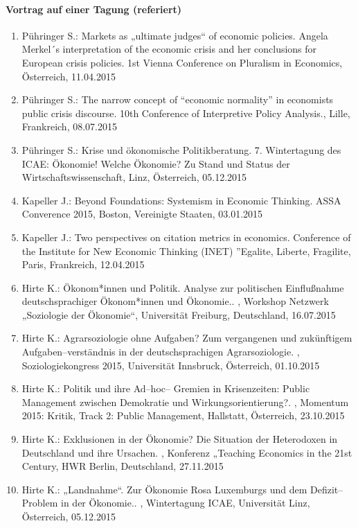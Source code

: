 \paragraph{Vortrag auf einer Tagung (referiert)}
\begin{enumerate}
	\item Pühringer S.: Markets as „ultimate judges“ of economic policies. Angela Merkel´s interpretation of the economic crisis and her conclusions for European crisis policies. 1st Vienna Conference on Pluralism in Economics, Österreich, 11.04.2015
	\item Pühringer S.: The narrow concept of “economic normality” in economists public crisis discourse. 10th Conference of Interpretive Policy Analysis., Lille, Frankreich, 08.07.2015
	\item Pühringer S.: Krise und ökonomische Politikberatung. 7. Wintertagung des ICAE: Ökonomie! Welche Ökonomie? Zu Stand und Status der Wirtschaftswissenschaft, Linz, Österreich, 05.12.2015
	\item Kapeller J.: Beyond Foundations: Systemism in Economic Thinking. ASSA Converence 2015, Boston, Vereinigte Staaten, 03.01.2015
	\item Kapeller J.: Two perspectives on citation metrics in economics. Conference of the Institute for New Economic Thinking (INET) ''Egalite, Liberte, Fragilite, Paris, Frankreich, 12.04.2015
	\item Hirte K.: Ökonom*innen und Politik. Analyse zur politischen Einflußnahme deutschsprachiger Ökonom*innen und Ökonomie.. , Workshop Netzwerk „Soziologie der Ökonomie“, Universität Freiburg, Deutschland, 16.07.2015
	\item Hirte K.: Agrarsoziologie ohne Aufgaben?  Zum vergangenen und zukünftigem Aufgaben--verständnis in der deutschsprachigen Agrarsoziologie. , Soziologiekongress 2015, Universität Innsbruck, Österreich, 01.10.2015
	\item Hirte K.: Politik und ihre Ad--hoc-- Gremien in Krisenzeiten: Public Management zwischen Demokratie und Wirkungsorientierung?. , Momentum 2015: Kritik, Track 2: Public Management, Hallstatt, Österreich, 23.10.2015
	\item Hirte K.: Exklusionen in der Ökonomie? Die Situation der Heterodoxen in Deutschland und ihre Ursachen. , Konferenz „Teaching Economics in the 21st Century, HWR Berlin, Deutschland, 27.11.2015
	\item Hirte K.: „Landnahme“. Zur Ökonomie Rosa Luxemburgs und dem Defizit--Problem in der Ökonomie.. , Wintertagung ICAE, Universität Linz, Österreich, 05.12.2015

\end{enumerate}
